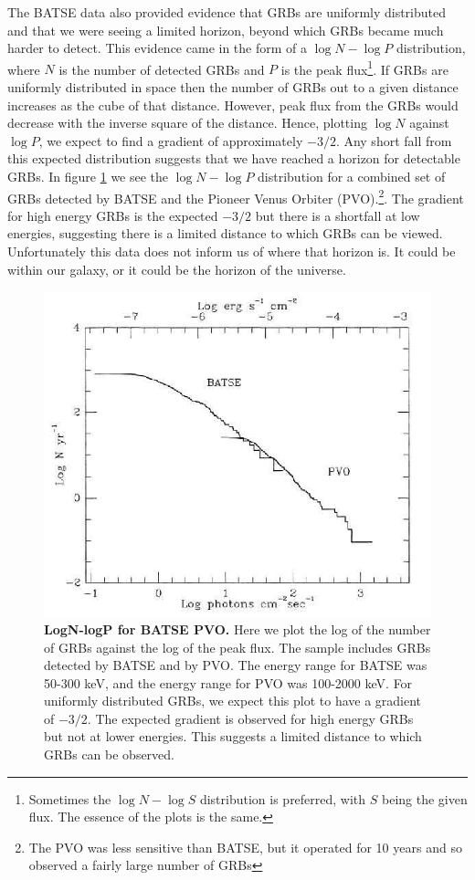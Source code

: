 \documentclass[11pt]{cuthesis}
\begin{document}
The BATSE data also provided evidence that GRBs are uniformly distributed and that we were seeing a limited horizon, beyond which GRBs became much harder to detect. This evidence came in the form of a $\log N - \log P$ distribution, where $N$ is the number of detected GRBs and $P$ is the peak flux\footnote{Sometimes the $\log N - \log S$ distribution is preferred, with $S$ being the given flux. The essence of the plots is the same.}. If GRBs are uniformly distributed in space then the number of GRBs out to a given distance increases as the cube of that distance. However, peak flux from the GRBs would decrease with the inverse square of the distance. Hence, plotting  $\log N$ against $\log P$, we expect to find a gradient of approximately $-3/2$. Any short fall from this expected distribution suggests that we have reached a horizon for detectable GRBs. In figure \ref{fig:logn - logp} we see the $\log N - \log P$ distribution for a combined set of GRBs detected by BATSE and the Pioneer Venus Orbiter (PVO).\footnote{ The PVO was less sensitive than BATSE, but it operated for 10 years and so observed a fairly large number of GRBs}. The gradient for high energy GRBs is the expected $-3/2$ but there is a shortfall at low energies, suggesting there is a limited distance to which GRBs can be viewed. Unfortunately this data does not inform us of where that horizon is. It could be within our galaxy, or it could be the horizon of the universe.   


\begin{figure} %
\begin{center}
\includegraphics[width=0.8\linewidth]{logN-logP.png}
\end{center}
\caption{\textbf{LogN-logP for BATSE PVO.} Here we plot the log of the number of GRBs against the log of the peak flux. The sample includes GRBs detected by BATSE and by PVO. The energy range for BATSE was 50-300 keV, and the energy range for PVO was 100-2000 keV. For uniformly distributed GRBs, we expect this plot to have a gradient of $-3/2$. The expected gradient is observed for high energy GRBs but not at lower energies. This suggests a limited distance to which GRBs can be observed. \cite{batse_vpo2, batse_vpo1}
}
\label{fig:logn - logp}
\end{figure}
\end{document}
